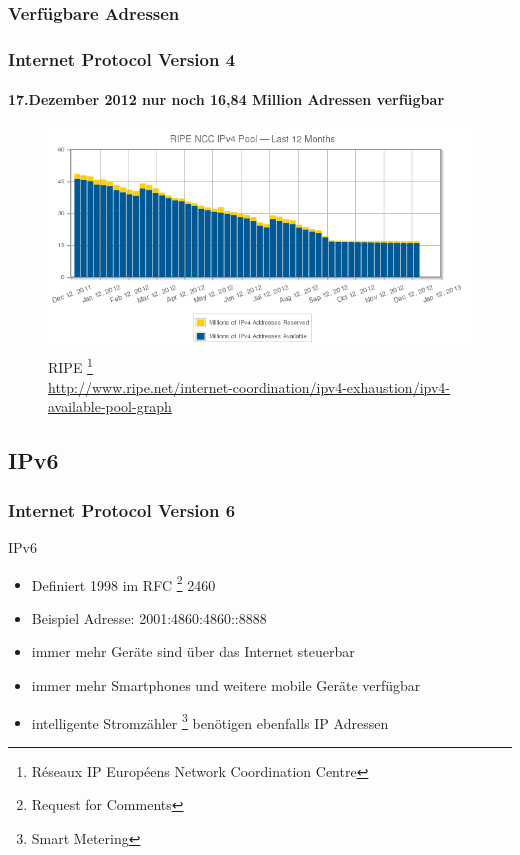 \documentclass[xcolor=dvipsnames]{beamer}
\begin{document}
\subsubsection{Verfügbare Adressen}
\begin{frame}  
  \frametitle{Internet Protocol Version 4}
  \framesubtitle{17.Dezember 2012 nur noch 16,84 Million Adressen verfügbar}
	\begin{figure}
	\includegraphics[scale=0.4]{IPv4_pool.png}
			\caption{RIPE \footnote{Réseaux IP Européens Network Coordination Centre} \\ \tiny{\textcolor{gray}{\url{http://www.ripe.net/internet-coordination/ipv4-exhaustion/ipv4-available-pool-graph}}}}
	\end{figure}
\end{frame}

\subsection{IPv6}
\begin{frame}
  \frametitle{Internet Protocol Version 6}
  \begin{block}{IPv6}
	  \begin{itemize}
  		\item Definiert 1998 im RFC \footnote{Request for Comments} 2460 
  		\item Beispiel Adresse: 2001:4860:4860::8888
		\item immer mehr Geräte sind über das Internet steuerbar
		\item immer mehr Smartphones und weitere mobile Geräte verfügbar
		\item intelligente Stromzähler \footnote{Smart Metering} benötigen ebenfalls IP Adressen
	  \end{itemize}
  \end{block}
\end{frame}
\end{document}
